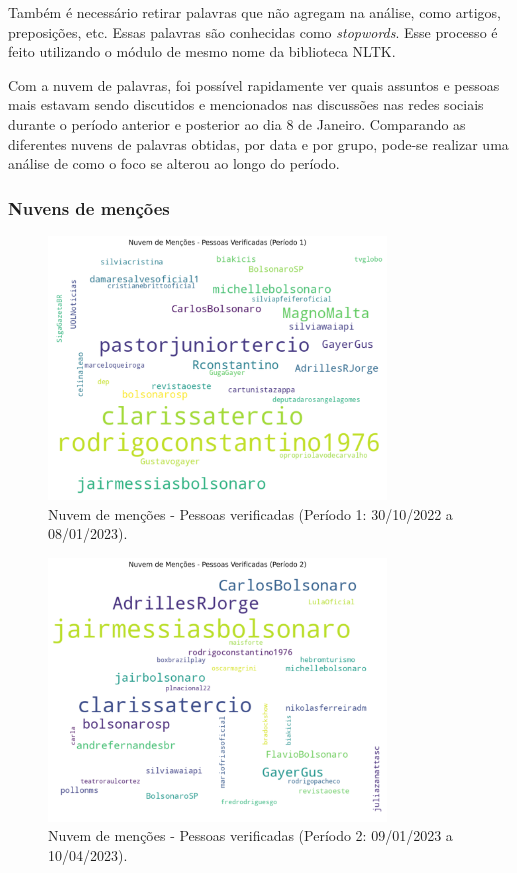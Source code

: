 \documentclass[manuscript,screen,review]{acmart}
\begin{document}
Também é necessário retirar palavras que não agregam na análise, como artigos, preposições, etc. Essas palavras são conhecidas como \textit{stopwords}. Esse processo é feito utilizando o módulo de mesmo nome da biblioteca NLTK.

Com a nuvem de palavras, foi possível rapidamente ver quais assuntos e pessoas mais estavam sendo discutidos e mencionados nas discussões nas redes sociais durante o período anterior e posterior ao dia 8 de Janeiro. Comparando as diferentes nuvens de palavras obtidas, por data e por grupo, pode-se realizar uma análise de como o foco se alterou ao longo do período.

\subsubsection{Nuvens de menções}

\begin{figure}[h]
\centering
\includegraphics[width=0.8\textwidth]{figura13_mencoes_verificadas_periodo1.png}
\caption{Nuvem de menções - Pessoas verificadas (Período 1: 30/10/2022 a 08/01/2023).}
\label{fig:figura13}
\end{figure}

\begin{figure}[h]
\centering
\includegraphics[width=0.8\textwidth]{figura14_mencoes_verificadas_periodo2.png}
\caption{Nuvem de menções - Pessoas verificadas (Período 2: 09/01/2023 a 10/04/2023).}
\label{fig:figura14}
\end{figure}
\end{document}
